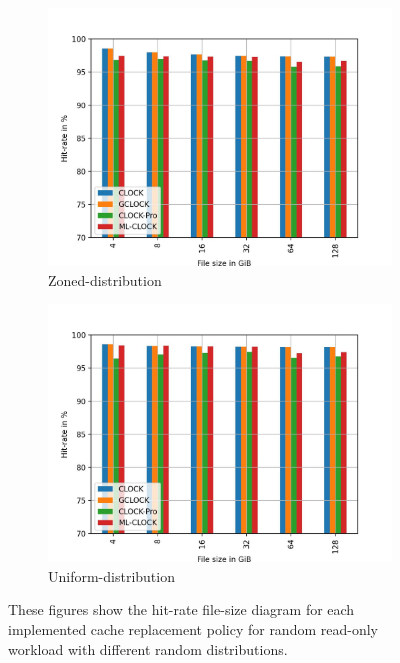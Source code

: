 \documentclass[
	12pt,
	a4paper,
	abstract,
	bibliography=totoc,
	chapterprefix,
	headings=openright,
	numbers=endperiod,
	parskip=half,
	twoside,
]{scrreprt}
\begin{document}
\begin{figure}[H]
\begin{subfigure}{0.4\textwidth}
		\includegraphics[width=\textwidth]{randread_zoned.jpg}		
		\caption{Zoned-distribution}
		\label{fig:randread zoned}
	\end{subfigure}
	\hfill
	\begin{subfigure}{0.4\textwidth}
		\includegraphics[width=\textwidth]{randread_uniform.jpg}		
		\caption{Uniform-distribution}
		\label{fig:randread uniform}
	\end{subfigure}
	\caption{These figures show the hit-rate file-size diagram for each implemented cache replacement policy for random read-only 
	workload with different random distributions.}
	\label{fig:single 100p read}
\end{figure}
\end{document}
